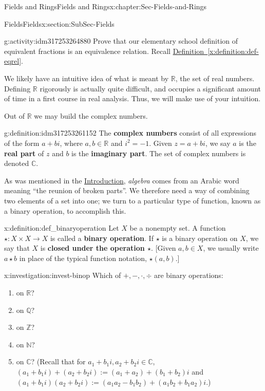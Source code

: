 \documentclass[oneside,10pt,]{book}
\newcommand{\xreffont}{\relax}
\newcommand{\terminology}[1]{\textbf{#1}}
\numberwithin{equation}{section}
\def\C{{\mathbb C}}
\def\Z{{\mathbb Z}}
\def\Q{{\mathbb Q}}
\def\N{{\mathbb N}}
\def\R{{\mathbb R}}
\begin{document}
\begin{chapterptx}{Fields and Rings}{}{Fields and Rings}{}{}{x:chapter:Sec-Fields-and-Rings}
\begin{sectionptx}{Fields}{}{Fields}{}{}{x:section:SubSec-Fields}
\begin{activity}{}{g:activity:idm317253264880}%
Prove that our elementary school definition of equivalent fractions is an equivalence relation. Recall \hyperref[x:definition:def-eqrel]{Definition~{\xreffont\ref{x:definition:def-eqrel}}}.%
\end{activity}
We likely have an intuitive idea of what is meant by \(\R\), the set of real numbers. Defining \(\R\) rigorously is actually quite difficult, and occupies a significant amount of time in a first course in real analysis. Thus, we will make use of your intuition. %
\par
Out of \(\R\) we may build the complex numbers.%
\begin{definition}{}{g:definition:idm317253261152}%
The \terminology{complex numbers} consist of all expressions of the form \(a+bi\), where \(a,b\in \R\) and \(i^2 = -1\). Given \(z = a+bi\), we say \(a\) is the \terminology{real part} of \(z\) and \(b\) is the \terminology{imaginary part}. The set of complex numbers is denoted \(\C\).%
\end{definition}
As was mentioned in the \hyperref[x:preface:Sec-Introduction]{Introduction}, \emph{algebra} comes from an Arabic word meaning ``the reunion of broken parts''. We therefore need a way of combining two elements of a set into one; we turn to a particular type of function, known as a binary operation, to accomplish this.%
\begin{definition}{}{x:definition:def_binaryoperation}%
%
 Let \(X\) be a nonempty set. A function \(\star : X \times X \to X\) is called a \terminology{binary operation}. If \(\star\) is a binary operation on \(X\), we say that \(X\) is \terminology{closed under the operation \(\star\)}. [Given \(a,b\in X\), we usually write \(a\star b\) in place of the typical function notation, \(\star(a,b)\).]%
\end{definition}
\begin{investigation}{}{x:investigation:invest-binop}%
Which of \(+, -, \cdot, \div\) are binary operations:%
\begin{enumerate}
\item{}on \(\R\)?%
\item{}on \(\Q\)?%
\item{}on \(\Z\)?%
\item{}on \(\N\)?%
\item{}on \(\C\)? (Recall that for \(a_1 + b_1 i, a_2 + b_2 i \in \C\), \((a_1 + b_1 i) + (a_2 + b_2 i) := (a_1 + a_2) + (b_1 + b_2)i\) and  \((a_1 + b_1 i)(a_2 + b_2 i) := (a_1 a_2 - b_1 b_2) + (a_1 b_2 + b_1 a_2) i\).)%

\end{enumerate}
\end{investigation}
\end{sectionptx}
\end{chapterptx}
\end{document}
